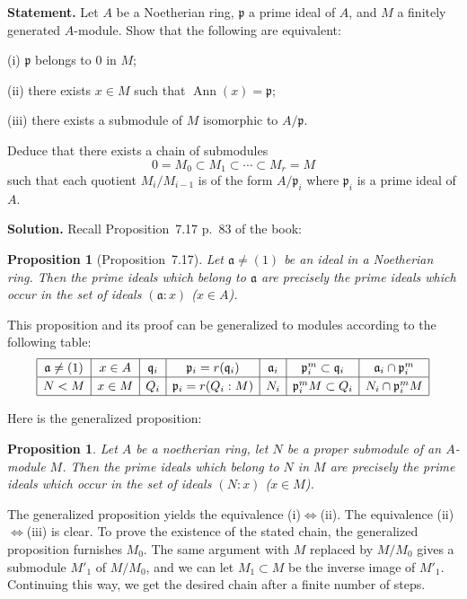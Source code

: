 \documentclass[12pt,letterpaper]{article}%
\newcommand{\oo}{\operatorname}\newcommand{\ooo}{\operatorname*}
\newcommand{\mf}{\mathfrak}
\newcommand{\aaa}{\mf a}
\newcommand{\ppp}{\mf p}
\newcommand{\qqq}{\mf q}
\newcommand{\Ann}{\oo{Ann}}
\newcommand{\nn}{\noindent}
\newtheorem{prop}[thm]{Proposition}
\begin{document}
\textbf{Statement.} Let $A$ be a Noetherian ring, $\ppp$ a prime ideal of $A$, and $M$ a finitely generated $A$-module. Show that the following are equivalent:

\nn(i) $\ppp$ belongs to $0$ in $M$;

\nn(ii) there exists $x\in M$ such that $\Ann(x)=\ppp$;

\nn(iii) there exists a submodule of $M$ isomorphic to $A/\ppp$.

Deduce that there exists a chain of submodules
$$
0=M_0\subset M_1\subset\cdots\subset M_r=M
$$ 
such that each quotient $M_i/M_{i-1}$ is of the form $A/\ppp_i$ where $\ppp_i$ is a prime ideal of $A$.

\nn\textbf{Solution.} Recall Proposition~7.17 p.~83 of the book:

\begin{prop}[Proposition~7.17]
Let $\aaa\ne(1)$ be an ideal in a Noetherian ring. Then the prime ideals which belong to $\aaa$ are precisely the prime ideals which occur in the set of ideals $(\aaa:x)$ ($x\in A$).
\end{prop}

This proposition and its proof can be generalized to modules according to the following table: 
$$
{\renewcommand{\arraystretch}{1.2}%
\begin{array}{|c|c|c|c|c|c|c|}\hline
\aaa\ne(1)&x\in A&\qqq_i&\ppp_i=r(\qqq_i)&\aaa_i&\ppp_i^m\subset\qqq_i&\aaa_i\cap\ppp_i^m\\ \hline
N<M&x\in M&Q_i&\ppp_i=r(Q_i:M)&N_i&\ppp_i^mM\subset Q_i&N_i\cap\ppp_i^mM\\ \hline
\end{array}}
$$

Here is the generalized proposition:

\begin{prop}
Let $A$ be a noetherian ring, let $N$ be a proper submodule of an $A$-module $M$. Then the prime ideals which belong to $N$ in $M$ are precisely the prime ideals which occur in the set of ideals $(N:x)$ ($x\in M$).
\end{prop}

The generalized proposition yields the equivalence (i)$\iff$(ii). The equivalence (ii)$\iff$(iii) is clear. To prove the existence of the stated chain, the generalized proposition furnishes $M_0$. The same argument with $M$ replaced by $M/M_0$ gives a submodule $M'_1$ of $M/M_0$, and we can let $M_1\subset M$ be the inverse image of $M'_1$. Continuing this way, we get the desired chain after a finite number of steps.
\end{document}
